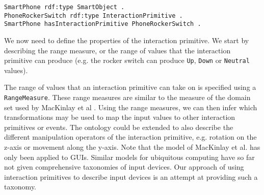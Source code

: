 \begin{verbatim}
SmartPhone rdf:type SmartObject .
PhoneRockerSwitch rdf:type InteractionPrimitive .
SmartPhone hasInteractionPrimitive PhoneRockerSwitch .
\end{verbatim}

We now need to define the properties of the interaction primitive. We start by describing the range measure, or the range of values that the interaction primitive can produce (e.g. the rocker switch can produce \texttt{Up}, \texttt{Down} or \texttt{Neutral} values).

The range of values that an interaction primitive can take on is specified using a \texttt{RangeMeasure}.  These range measures are similar to the measure of the domain set used by MacKinlay et al \cite{MacKinlay1990}. Using the range measures, we can then infer which transformations may be used to map the input values to other interaction primitives or events. The ontology could be extended to also describe the different manipulation operators of the interaction primitive, e.g. rotation on the z-axis or movement along the y-axis. Note that the model of MacKinlay et al. has only been applied to \acp{GUI}. Similar models for ubiquitous computing have so far not given comprehensive taxonomies of input devices. Our approach of using interaction primitives to describe input devices is an attempt at providing such a taxonomy.

% 
% 	

% 


